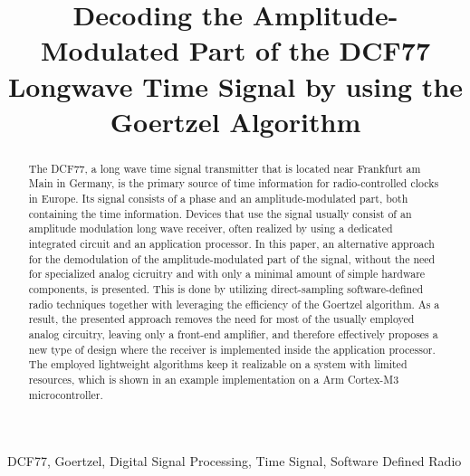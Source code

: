\documentclass[conference]{IEEEtran}
\begin{document}
\title{Decoding the Amplitude-Modulated Part of the DCF77 Longwave Time Signal by using the Goertzel Algorithm}

\author{
}

\maketitle

\begin{abstract}
    The DCF77, a long wave time signal transmitter that is located near Frankfurt am Main in Germany, is the primary source of time information for
    radio-controlled clocks in Europe. Its signal consists of a phase and an amplitude-modulated part, both containing the time information.
    Devices that use the signal usually consist of an amplitude modulation long wave receiver, often realized by using a dedicated integrated circuit and an
    application processor. In this paper, an alternative approach for the demodulation of the amplitude-modulated part of the signal, without the need for specialized
    analog cicruitry and with only a minimal amount of simple hardware components, is presented.
    This is done by utilizing direct-sampling software-defined radio techniques together with leveraging the efficiency of the Goertzel algorithm.
    As a result, the presented approach removes the need for most of the usually employed analog circuitry, leaving only a front-end amplifier, and therefore
    effectively proposes a new type of design where the receiver is implemented inside the application processor.
    The employed lightweight algorithms keep it realizable on a system with limited resources, which is shown in an example implementation on a Arm Cortex-M3 microcontroller. 
\end{abstract}

\begin{IEEEkeywords}
    DCF77, Goertzel, Digital Signal Processing, Time Signal, Software Defined Radio
\end{IEEEkeywords}
\end{document}

